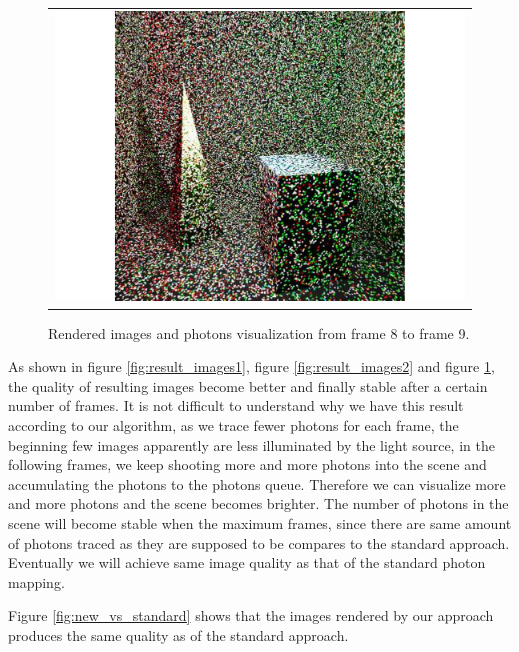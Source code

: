 \begin{figure}
\begin{center}
{\begin{tabular}{c}
\includegraphics*[scale=0.2]{imgs/pqv_frame9.pdf}
\end{tabular}
}%
\renewcommand{\thefigure}{\thechapter.\arabic{figure}}
\caption[Rendered images and photons visualization from frame 8 to frame 9]{Rendered images and photons visualization from frame 8 to frame 9.}
\label{fig:result_images3}
\end{center}
\end{figure}

As shown in figure \ref{fig:result_images1}, figure \ref{fig:result_images2} and figure \ref{fig:result_images3}, the quality of resulting images become better and finally stable after a certain number of frames. It is not difficult to understand why we have this result according to our algorithm, as we trace fewer photons for each frame, the beginning few images apparently are less illuminated by the light source, in the following frames, we keep shooting more and more photons into the scene and accumulating the photons to the photons queue. Therefore we can visualize more and more photons and the scene becomes brighter. The number of photons in the scene will become stable when the maximum frames, since there are same amount of photons traced as they are supposed to be compares to the standard approach. Eventually we will achieve same image quality as that of the standard photon mapping.

Figure \ref{fig:new_vs_standard} shows that the images rendered by our approach produces the same quality as of the standard approach.


